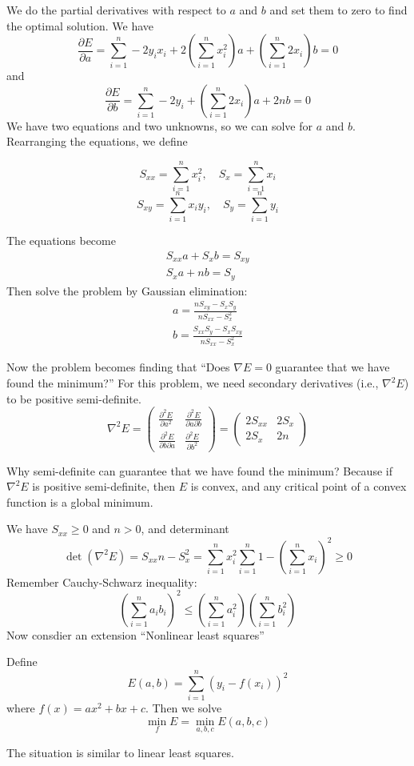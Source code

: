We do the partial derivatives with respect to $a$ and $b$ and set them to zero to find the optimal solution. We have \[
    \frac{\partial E}{\partial a} = \sum_{i=1}^n -2y_i x_i + 2 \left(\sum_{i=1}^n x_i^2\right)a + \left(\sum_{i=1}^n 2x_i\right)b = 0
\]
and \[
    \frac{\partial E}{\partial b} = \sum_{i=1}^n -2y_i + \left(\sum_{i=1}^n 2x_i\right)a + 2nb = 0
\]
We have two equations and two unknowns, so we can solve for $a$ and $b$. Rearranging the equations, we define 
\begin{definition}
    \[
        S_{xx} = \sum_{i=1}^n x_i^2, \quad S_{x} = \sum_{i=1}^n x_i
    \]
    \[
        S_{xy} = \sum_{i=1}^n x_i y_i, \quad S_{y} = \sum_{i=1}^n y_i
    \]
\end{definition}
The equations become \begin{gather*}
S_{xx} a + S_x b = S_{xy}\\
S_x a + n b = S_y 
\end{gather*}
Then solve the problem by Gaussian elimination: \begin{gather*}
a = \frac{n S_{xy} - S_x S_y}{n S_{xx} - S_x^2}\\
b = \frac{S_{xx} S_y - S_x S_{xy}}{nS_{xx} - S_x^2}
\end{gather*}

Now the problem becomes finding that ``Does $\nabla E = 0$ guarantee that we have found the minimum?'' For this problem, we need secondary derivatives (i.e., $\nabla^2 E$) to be positive semi-definite.
\[
    \nabla^2 E = \begin{pmatrix}
        \frac{\partial^2 E}{\partial a^2} & \frac{\partial^2 E}{\partial a \partial b}\\
        \frac{\partial^2 E}{\partial b \partial a} & \frac{\partial^2 E}{\partial b^2}
    \end{pmatrix} = \begin{pmatrix}
        2 S_{xx} & 2 S_x\\
        2 S_x & 2n
    \end{pmatrix}
\]
\begin{note}
    Why semi-definite can guarantee that we have found the minimum? Because if $\nabla^2 E$ is positive semi-definite, then $E$ is convex, and any critical point of a convex function is a global minimum.
\end{note}

We have $S_{xx} \geq 0$ and $n > 0$, and determinant \[
    \det(\nabla^2 E) = S_{xx} n - S_x^2 = \sum_{i=1}^n x_i^2 \sum_{i=1}^n 1 - \left(\sum_{i=1}^n x_i\right)^2 \geq 0
\]
Remember Cauchy-Schwarz inequality: \[
    \left(\sum_{i=1}^n a_i b_i\right)^2 \leq \left(\sum_{i=1}^n a_i^2\right) \left(\sum_{i=1}^n b_i^2\right)
\]
Now consdier an extension ``Nonlinear least squares''
\begin{definition}
    Define \[
        E(a,b) = \sum_{i=1}^n (y_i - f(x_i))^2
    \]
    where $f(x) = ax^2 + bx + c$. Then we solve \[
        \min_{f} E = \min_{a,b,c} E(a,b,c)
    \]
\end{definition}
The situation is similar to linear least squares.

